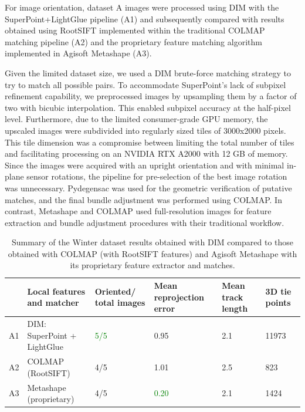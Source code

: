 For image orientation, dataset A images were processed using DIM with the SuperPoint+LightGlue pipeline (A1) and subsequently compared with results obtained using RootSIFT implemented within the traditional COLMAP matching pipeline (A2) and the proprietary feature matching algorithm implemented in Agisoft Metashape (A3).

Given the limited dataset size, we used a DIM brute-force matching strategy to try to match all possible pairs. 
To accommodate SuperPoint's lack of subpixel refinement capability, we preprocessed images by upsampling them by a factor of two with bicubic interpolation. 
This enabled subpixel accuracy at the half-pixel level. 
Furthermore, due to the limited consumer-grade GPU memory, the upscaled images were subdivided into regularly sized tiles of 3000x2000 pixels.  
This tile dimension was a compromise between limiting the total number of tiles and facilitating processing on an NVIDIA RTX A2000 with 12 GB of memory. 
Since the images were acquired with an upright orientation and with minimal in-plane sensor rotations, the pipeline for pre-selection of the best image rotation was unnecessary.  
Pydegensac was used for the geometric verification of putative matches, and the final bundle adjustment was performed using COLMAP. 
In contrast, Metashape and COLMAP used full-resolution images for feature extraction and bundle adjustment procedures with their traditional workflow.

\begin{table}
    \centering
    \caption{Summary of the Winter dataset results obtained with DIM compared to those obtained with COLMAP (with RootSIFT features) and Agisoft Metashape with its proprietary feature extractor and matches.} 
    \label{tab:5:winter_statistics}
    
    \begin{tabular}{l p{3.5cm} p{2.2cm} p{2.2cm} p{2.2cm} p{2.2cm}}
    \toprule
    &Local features \newline and matcher & Oriented/ \newline total images & Mean reprojection error \newline [px] & Mean track \newline length &  3D tie points\\
    \midrule
    A1 &DIM: SuperPoint \newline + LightGlue           & \textcolor{green}{5/5}     & 0.95 & 2.1  & 11973 \\
    A2 &COLMAP \newline (RootSIFT)                     & 4/5      & 1.01    & 2.5    & 823   \\
    A3 &Metashape \newline(proprietary)               & 4/5     & \textcolor{green}{0.20}  & 2.1   & 1424 \\
    \bottomrule
    \end{tabular}
\end{table}

